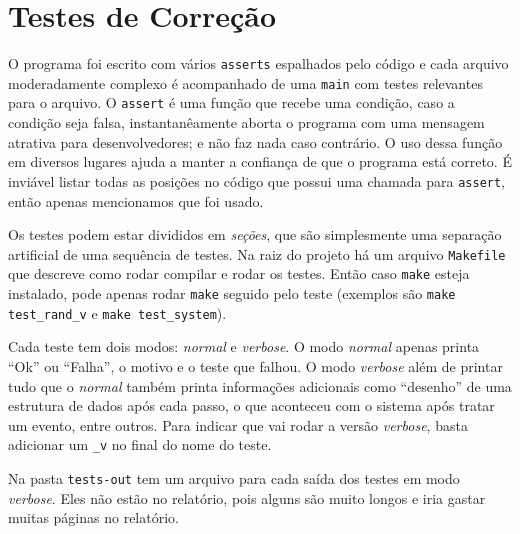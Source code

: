 \documentclass[a4paper]{article}
\newcommand{\arq}{\texttt}
\newcommand{\inlcode}{\texttt}
\begin{document}
\newpage
\section{Testes de Correção}
O programa foi escrito com vários \inlcode{asserts}
espalhados pelo código
e cada arquivo moderadamente complexo é acompanhado
de uma \inlcode{main} com testes relevantes para o arquivo.
O \inlcode{assert} é uma função que recebe uma condição,
caso a condição seja falsa,
instantanêamente aborta o programa com uma mensagem
atrativa para desenvolvedores;
e não faz nada caso contrário.
O uso dessa função em diversos lugares ajuda a
manter a confiança de que o programa está correto.
É inviável listar todas as posições no código
que possui uma chamada para \inlcode{assert},
então apenas mencionamos que foi usado.

Os testes podem estar divididos em \emph{seções},
que são simplesmente uma separação artificial
de uma sequência de testes.
Na raiz do projeto há um arquivo \arq{Makefile} que descreve
como rodar compilar e rodar os testes.
Então caso \inlcode{make} esteja instalado,
pode apenas rodar \inlcode{make} seguido pelo teste
(exemplos são \inlcode{make test\_rand\_v}
e \inlcode{make test\_system}).

Cada teste tem dois modos:
\emph{normal} e \emph{verbose}.
O modo \emph{normal} apenas printa
``Ok'' ou ``Falha'', o motivo e o teste que falhou.
O modo \emph{verbose} além de printar tudo que o \emph{normal}
também printa informações adicionais
como ``desenho'' de uma estrutura de dados após cada passo,
o que aconteceu com o sistema após tratar um evento, entre outros.
Para indicar que vai rodar a versão \emph{verbose},
basta adicionar um \inlcode{\_v} no final do nome do teste.

Na pasta \arq{tests-out} tem um arquivo
para cada saída dos testes
em modo \emph{verbose}.
Eles não estão no relatório,
pois alguns são muito longos
e iria gastar muitas páginas no relatório.
\end{document}
